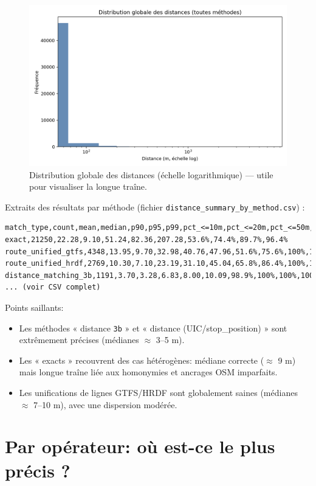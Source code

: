 \begin{figure}[h]
    \centering
    \includegraphics[width=\textwidth]{../figures/chap5/distances_global_hist.png}
    \caption[Distribution globale (log)]{Distribution globale des distances (échelle logarithmique) — utile pour visualiser la longue traîne.}
\end{figure}

\noindent Extraits des résultats par méthode (fichier \texttt{distance\_summary\_by\_method.csv}) :

\begin{verbatim}
match_type,count,mean,median,p90,p95,p99,pct_<=10m,pct_<=20m,pct_<=50m,pct_<=100m
exact,21250,22.28,9.10,51.24,82.36,207.28,53.6%,74.4%,89.7%,96.4%
route_unified_gtfs,4348,13.95,9.70,32.98,40.76,47.96,51.6%,75.6%,100%,100%
route_unified_hrdf,2769,10.30,7.10,23.19,31.10,45.04,65.8%,86.4%,100%,100%
distance_matching_3b,1191,3.70,3.28,6.83,8.00,10.09,98.9%,100%,100%,100%
... (voir CSV complet)
\end{verbatim}

Points saillants:
\begin{itemize}
    \item Les méthodes « distance \texttt{3b} » et « distance (UIC/stop\_position) » sont extrêmement précises (médianes \(\approx\) 3–5 m).
    \item Les « exacts » recouvrent des cas hétérogènes: médiane correcte (\(\approx\) 9 m) mais longue traîne liée aux homonymies et ancrages OSM imparfaits.
    \item Les unifications de lignes GTFS/HRDF sont globalement saines (médianes \(\approx\) 7–10 m), avec une dispersion modérée.
\end{itemize}

\section{Par opérateur: où est-ce le plus précis ?}


